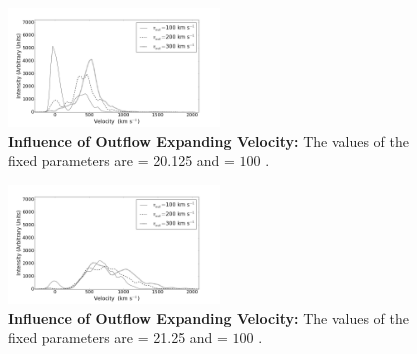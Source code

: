 \begin{figure}[h!]
	\begin{center}
		\includegraphics[width=0.5\textwidth]{./figures/appendix/inf_vout1_soft.png}
	\end{center}
	\caption{\textbf{Influence of Outflow Expanding Velocity:} The values of the fixed parameters are \lognh = 20.125 and \vrot = $100$ \kms.}
	\label{fig:influence_vout1}
\end{figure}

\begin{figure}[h!]
	\begin{center}
		\includegraphics[width=0.5\textwidth]{./figures/appendix/inf_vout2_soft.png}
	\end{center}
	\caption{\textbf{Influence of Outflow Expanding Velocity:} The values of the fixed parameters are \lognh = 21.25 and \vrot = $100$ \kms.}
	\label{fig:influence_vout2}
\end{figure}